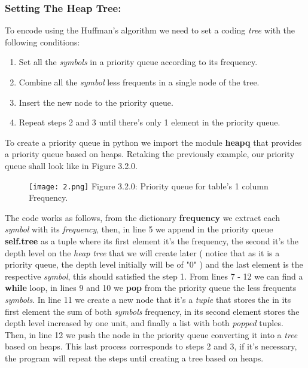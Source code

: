 \subsubsection{Setting The Heap Tree:}

To encode using the Huffman's algorithm we need to set a coding {\itshape tree} with the following conditions:

\begin{enumerate}
\item Set all the {\itshape symbols} in a priority queue according to its frequency.
\item Combine all the {\itshape symbol} less frequents in a single node of the tree.
\item Insert the new node to the priority queue.
\item Repeat steps 2 and 3 until there's only 1 element in the priority queue.
\end{enumerate} 

To create a priority queue in python we import the module {\bfseries heapq} that provides a priority queue based on heaps. Retaking the previously example, our priority queue shall look like in Figure 3.2.0. \hfill \break

\begin{figure}[H]
\texttt{[image: 2.png]}
\centering \linebreak \linebreak Figure 3.2.0: Priority queue for table's 1 column Frequency.
\end{figure} \hfill \break

The code works as follows, from the dictionary {\bfseries frequency} we extract each {\itshape symbol} with its {\itshape frequency}, then, in line 5 we append in the priority queue {\bfseries self.tree} as a tuple where its first element it's the frequency, the second it's the depth level on the {\itshape heap tree} that we will create later ( notice that as it is a priority queue, the depth level initially will be of "0" ) and the last element is the respective {\itshape symbol}, this should satisfied the step 1. From lines 7 - 12 we can find a {\bfseries while} loop, in lines 9 and 10 we {\bfseries pop} from the priority queue the less frequents {\itshape symbols}. In line 11 we create a new node that it's a {\itshape tuple} that stores the in its first element the sum of both {\itshape symbols} frequency, in its second element stores the depth level increased by one unit, and finally a list with both {\itshape popped} tuples. Then, in line 12 we push the node in the priority queue converting it into a {\itshape tree} based on heaps. This last process corresponds to steps 2 and 3, if it's necessary, the program will repeat the steps until creating a tree based on heaps.  \hfill \break

